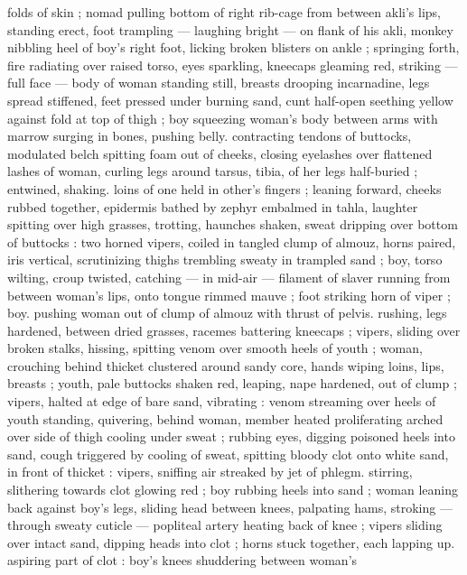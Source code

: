 folds of skin ; nomad pulling bottom of right rib-cage from between 
akli's lips, standing erect, foot trampling --- laughing bright --- on 
flank of his akli, monkey nibbling heel of boy's right foot, licking 
broken blisters on ankle ; springing forth, fire radiating over raised 
torso, eyes sparkling, kneecaps gleaming red, striking --- full face 
--- body of woman standing still, breasts drooping incarnadine, legs 
spread stiffened, feet pressed under burning sand, cunt half-open 
seething yellow against fold at top of thigh ; boy squeezing woman's 
body between arms with marrow surging in bones, pushing belly. 
contracting tendons of buttocks, modulated belch spitting foam out 
of cheeks, closing eyelashes over flattened lashes of woman, curling 
legs around tarsus, tibia, of her legs half-buried ; entwined, shaking. 
loins of one held in other's fingers ; leaning forward, cheeks rubbed 
together, epidermis bathed by zephyr embalmed in tahla, laughter 
spitting over high grasses, trotting, haunches shaken, sweat dripping 
over bottom of buttocks : two horned vipers, coiled in tangled clump 
of almouz, horns paired, iris vertical, scrutinizing thighs trembling 
sweaty in trampled sand ; boy, torso wilting, croup twisted, catching 
--- in mid-air --- filament of slaver running from between woman's 
lips, onto tongue rimmed mauve ; foot striking horn of viper ; boy. 
pushing woman out of clump of almouz with thrust of pelvis. 
rushing, legs hardened, between dried grasses, racemes battering 
kneecaps ; vipers, sliding over broken stalks, hissing, spitting venom 
over smooth heels of youth ; woman, crouching behind thicket 
clustered around sandy core, hands wiping loins, lips, breasts ; 
youth, pale buttocks shaken red, leaping, nape hardened, out of 
clump ; vipers, halted at edge of bare sand, vibrating : venom 
streaming over heels of youth standing, quivering, behind woman, 
member heated proliferating arched over side of thigh cooling under 
sweat ; rubbing eyes, digging poisoned heels into sand, cough 
triggered by cooling of sweat, spitting bloody clot onto white sand, 
in front of thicket : vipers, sniffing air streaked by jet of phlegm. 
stirring, slithering towards clot glowing red ; boy rubbing heels into 
sand ; woman leaning back against boy's legs, sliding head between 
knees, palpating hams, stroking --- through sweaty cuticle --- 
popliteal artery heating back of knee ; vipers sliding over intact 
sand, dipping heads into clot ; horns stuck together, each lapping up. 
aspiring part of clot : boy's knees shuddering between woman's 
